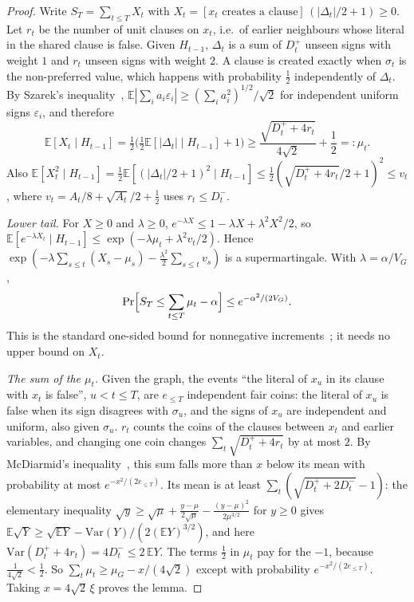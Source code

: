 \documentclass[11pt,a4paper]{article}
\theoremstyle{remark}
\newcommand{\E}{\mathbb{E}}
\begin{document}
\begin{proof}
Write $S_T=\sum_{t\le T}X_t$ with $X_t=[x_t\text{ creates a
clause}]\,(|\Delta_t|/2+1)\ge0$. Let $r_t$ be the number of unit clauses on
$x_t$, i.e.\ of earlier neighbours whose literal in the shared clause is
false. Given $H_{t-1}$, $\Delta_t$ is a sum of $D^+_t$ unseen signs with weight
$1$ and $r_t$ unseen signs with weight $2$. A clause is created exactly when
$\sigma_t$ is the non-preferred value, which happens with probability
$\frac12$ independently of $\Delta_t$. By Szarek's inequality~\cite{Sza76},
$\E|\sum_ia_i\varepsilon_i|\ge(\sum_ia_i^2)^{1/2}/\sqrt2$ for independent
uniform signs $\varepsilon_i$, and therefore
\[
 \E[X_t\mid H_{t-1}]=\tfrac12\bigl(\tfrac12\E[|\Delta_t|\mid H_{t-1}]+1\bigr)
 \ge\frac{\sqrt{D^+_t+4r_t}}{4\sqrt2}+\frac12=:\mu_t .
\]
Also $\E[X_t^2\mid H_{t-1}]=\frac12\E[(|\Delta_t|/2+1)^2\mid H_{t-1}]
\le\frac12(\sqrt{D^+_t+4r_t}/2+1)^2\le v_t$, where
$v_t=A_t/8+\sqrt{A_t}/2+\frac12$ uses $r_t\le D^-_t$.

\emph{Lower tail.} For $X\ge0$ and $\lambda\ge0$, $e^{-\lambda X}\le1-\lambda
X+\lambda^2X^2/2$, so $\E[e^{-\lambda X_t}\mid H_{t-1}]\le\exp(-\lambda
\mu_t+\lambda^2v_t/2)$. Hence $\exp(-\lambda\sum_{s\le t}(X_s-\mu_s)-\frac{\lambda^2}
2\sum_{s\le t}v_s)$ is a supermartingale. With $\lambda=\alpha/V_G$,
\[
 \Pr\Bigl[S_T\le\sum_{t\le T}\mu_t-\alpha\Bigr]\le e^{-\alpha^2/(2V_G)}.
\]
This is the standard one-sided bound for nonnegative increments~\cite{Mau03};
it needs no upper bound on $X_t$.

\emph{The sum of the $\mu_t$.} Given the graph, the events ``the literal of
$x_u$ in its clause with $x_t$ is false'', $u<t\le T$, are $e_{\le T}$
independent fair coins: the literal of $x_u$ is false when its sign disagrees
with $\sigma_u$, and the signs of $x_u$ are independent and uniform, also given
$\sigma_u$. $r_t$ counts the coins of the clauses
between $x_t$ and earlier variables, and changing one coin changes
$\sum_t\sqrt{D^+_t+4r_t}$ by at most $2$. By McDiarmid's
inequality~\cite{McD89}, this sum falls more than $x$ below its mean with
probability at most $e^{-x^2/(2e_{\le T})}$. Its mean is at least
$\sum_t(\sqrt{D^+_t+2D^-_t}-1)$: the elementary inequality
$\sqrt y\ge\sqrt\mu+\frac{y-\mu}{2\sqrt\mu}-\frac{(y-\mu)^2}{2\mu^{3/2}}$ for
$y\ge0$ gives $\E\sqrt Y\ge\sqrt{\E Y}-\mathrm{Var}(Y)/(2(\E Y)^{3/2})$, and
here $\mathrm{Var}(D^+_t+4r_t)=4D^-_t\le2\,\E Y$. The terms $\frac12$ in $\mu_t$
pay for the $-1$, because $\frac1{4\sqrt2}<\frac12$. So
$\sum_t\mu_t\ge\mu_G-x/(4\sqrt2)$ except with probability
$e^{-x^2/(2e_{\le T})}$. Taking $x=4\sqrt2\,\xi$ proves the lemma.
\end{proof}
\end{document}
